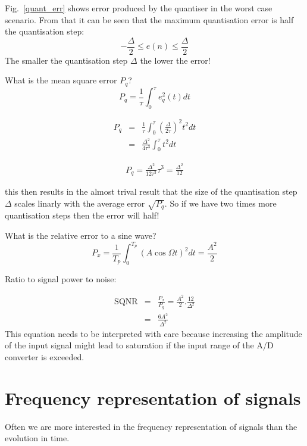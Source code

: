 \documentclass[12pt,a4paper]{article}
\begin{document}
Fig.~\ref{quant_err} shows error produced by the quantiser in the
worst case scenario. From that it can be seen that the maximum quantisation
error is half the quantisation step:
\begin{equation}
- \frac{\Delta}{2} \le e(n) \le \frac{\Delta}{2}
\end{equation}
The smaller the quantisation step $\Delta$ the lower the error!

What is the mean square error $P_{q}$?
\begin{equation}
P_{q} = \frac {1}{\tau} \int_{0}^{\tau} e_{q}^{2}(t)  dt
\end{equation}

\begin{eqnarray}
P_{q} & = & \frac{1}{\tau} \int_0^\tau \left(\frac{\Delta}{2\tau}\right)^2 t^2 dt \\
      & = & \frac{\Delta^2}{4 \tau^3} \int_0^\tau t^2 dt
\end{eqnarray}

\begin{eqnarray}
P_{q} = \frac{\Delta^2}{12\tau^3} \tau^3 =\frac{\Delta^2}{12}
\end{eqnarray}

this then results in the almost trival result that the size of the
quantisation step $\Delta$ scales linarly with the average error $\sqrt{P_{q}}$. So if we
have two times more quantisation steps then the error will half!

What is the relative error to a sine wave?
\begin{equation}
P_x = \frac{1}{T_p} \int_{0}^{T_p}(A \cos \Omega t)^2 dt = \frac{A^2}{2}
\end{equation}

Ratio to signal power to noise:

\begin{eqnarray}
\mbox {SQNR} &=& \frac {P_x}{P_q} = \frac{A^2}{2} . \frac{12}{\Delta^2} \\
             &=& \frac{6A^2}{\Delta^2}
\end{eqnarray}
This equation needs to be interpreted with care because increasing
the amplitude of the input signal might lead to saturation if the
input range of the A/D converter is exceeded.





\section{Frequency representation of signals}
Often we are more interested in the frequency representation
of signals than the evolution in time.
\end{document}
